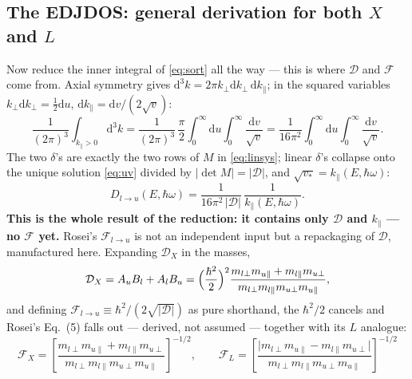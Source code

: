 \documentclass[11pt,a4paper]{article}
\numberwithin{equation}{section}
\begin{document}
\subsection{The EDJDOS: general derivation for both $X$ and $L$}
\label{sec:kernel}

Now reduce the inner integral of \eqref{eq:sort} all the way --- this
is where ${\mathcal{D}}$ and ${\mathcal{F}}$ come from.
Axial symmetry gives ${\mathrm{d}}^3k=2\pi{k_{\perp}}{\mathrm{d}}{k_{\perp}}\,{\mathrm{d}}{k_{\parallel}}$; in the
squared variables ${k_{\perp}}{\mathrm{d}}{k_{\perp}}=\tfrac12{\mathrm{d}} u$,
${\mathrm{d}}{k_{\parallel}}={\mathrm{d}} v/(2\sqrt v)$:
\begin{equation}
\frac{1}{(2\pi)^3}\int_{{k_{\parallel}}>0}\!\!{\mathrm{d}}^3k
=\frac{1}{(2\pi)^3}\,\frac{\pi}{2}
\int_0^\infty\!\!{\mathrm{d}} u\int_0^\infty\!\frac{{\mathrm{d}} v}{\sqrt v}
=\frac{1}{16\pi^2}\int_0^\infty\!\!{\mathrm{d}} u\int_0^\infty\!\frac{{\mathrm{d}} v}{\sqrt v}.
\end{equation}
The two $\delta$'s are exactly the two rows of $M$ in
\eqref{eq:linsys}; linear $\delta$'s collapse onto the unique solution
\eqref{eq:uv} divided by $|\det M|=|{\mathcal{D}}|$, and $\sqrt{v_*}={k_{\parallel}}(E,{\hbar\omega})$:
\begin{equation}
{D_{l\to u}}(E,{\hbar\omega})=\frac{1}{16\pi^2\,|{\mathcal{D}}|}\,\frac{1}{{k_{\parallel}}(E,{\hbar\omega})} .
\label{eq:Draw}
\end{equation}
\textbf{This is the whole result of the reduction: it contains only
${\mathcal{D}}$ and ${k_{\parallel}}$ --- no ${\mathcal{F}}$ yet.}  Rosei's ${\mathcal{F}}_{l\to u}$ is not an
independent input but a repackaging of ${\mathcal{D}}$, manufactured here.
Expanding ${\mathcal{D}}_X$ in the masses,
\begin{equation}
{\mathcal{D}}_X=A_uB_l+A_lB_u
=\Bigl(\frac{\hbar^2}{2}\Bigr)^{2}
\frac{m_{l\perp}m_{u\parallel}+m_{l\parallel}m_{u\perp}}
{m_{l\perp}m_{l\parallel}m_{u\perp}m_{u\parallel}},
\end{equation}
and defining ${\mathcal{F}}_{l\to u}\equiv\hbar^2/(2\sqrt{|{\mathcal{D}}|})$ as pure
shorthand, the $\hbar^2/2$ cancels and Rosei's Eq.~(5) falls out ---
derived, not assumed --- together with its $L$ analogue:
\begin{equation}
{\mathcal{F}}_X=\left[\frac{m_{l\perp}m_{u\parallel}+m_{l\parallel}m_{u\perp}}
{m_{l\perp}m_{l\parallel}m_{u\perp}m_{u\parallel}}\right]^{-1/2},
\qquad
{\mathcal{F}}_L=\left[\frac{\bigl|m_{l\perp}m_{u\parallel}-m_{l\parallel}m_{u\perp}\bigr|}
{m_{l\perp}m_{l\parallel}m_{u\perp}m_{u\parallel}}\right]^{-1/2}
\tag{5}
\label{eq:Fmass}
\end{equation}
\end{document}

